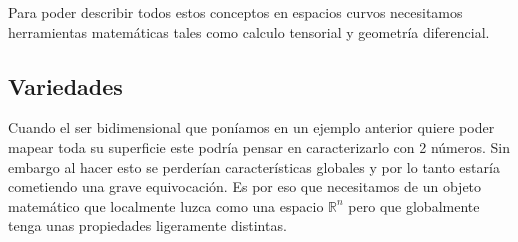 \documentclass[../Main.tex]{subfiles}
\begin{document}
Para poder describir todos estos conceptos en espacios curvos necesitamos herramientas matemáticas tales como calculo tensorial y geometría diferencial.

\subsection{Variedades}\label{subsec:Variedades}
Cuando el ser bidimensional que poníamos en un ejemplo anterior quiere poder mapear toda su superficie este podría pensar en caracterizarlo con 2 números. Sin embargo al hacer esto se perderían características globales y por lo tanto estaría cometiendo una grave equivocación. Es por eso que necesitamos de un objeto matemático que localmente luzca como una espacio $\mathbb{R}^n$ pero que globalmente tenga unas propiedades ligeramente distintas.
\end{document}
